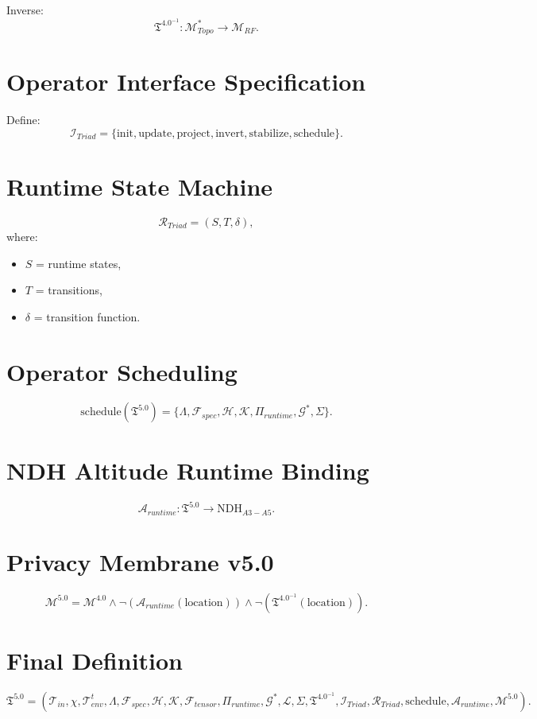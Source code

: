 \documentclass[11pt]{article}
\begin{document}
Inverse:
\[
\mathfrak{T}^{4.0^{-1}} : \mathcal{M}_{Topo}^{\ast} \to \mathcal{M}_{RF}.
\]

\section{Operator Interface Specification}
Define:
\[
\mathcal{I}_{Triad}
= \{\text{init},\text{update},\text{project},\text{invert},
\text{stabilize},\text{schedule}\}.
\]

\section{Runtime State Machine}
\[
\mathcal{R}_{Triad} = (S, T, \delta),
\]
where:
\begin{itemize}
\item $S$ = runtime states,
\item $T$ = transitions,
\item $\delta$ = transition function.
\end{itemize}

\section{Operator Scheduling}
\[
\text{schedule}(\mathfrak{T}^{5.0})
= \{\Lambda, \mathcal{F}_{spec}, \mathcal{H}, \mathcal{K},
\Pi_{runtime}, \mathcal{G}^{\ast}, \Sigma\}.
\]

\section{NDH Altitude Runtime Binding}
\[
\mathcal{A}_{runtime} :
\mathfrak{T}^{5.0} \to \text{NDH}_{A3-A5}.
\]

\section{Privacy Membrane v5.0}
\[
\mathcal{M}^{5.0}
= \mathcal{M}^{4.0}
\land \neg(\mathcal{A}_{runtime}(\text{location}))
\land \neg(\mathfrak{T}^{4.0^{-1}}(\text{location})).
\]

\section{Final Definition}
\[
\boxed{
\mathfrak{T}^{5.0} =
(\mathcal{T}_{in},\chi,\mathcal{T}_{env}^{t},\Lambda,
\mathcal{F}_{spec},\mathcal{H},\mathcal{K},
\mathcal{F}_{tensor},\Pi_{runtime},
\mathcal{G}^{\ast},\mathcal{L},\Sigma,
\mathfrak{T}^{4.0^{-1}},
\mathcal{I}_{Triad},\mathcal{R}_{Triad},
\text{schedule},\mathcal{A}_{runtime},\mathcal{M}^{5.0})
}.
\]
\end{document}
